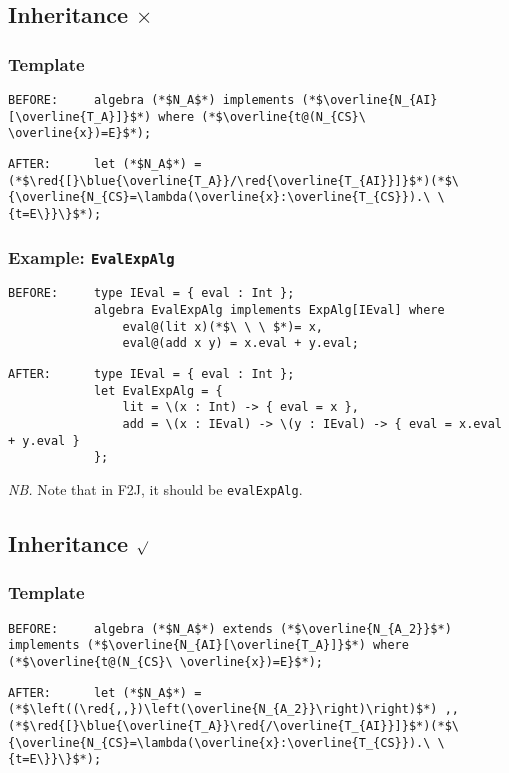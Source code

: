 \documentclass{article}
\newcommand{\red}[1]{\textcolor{red}{#1}}
\newcommand{\blue}[1]{\textcolor{blue}{#1}}
\newcommand{\nb}{\textit{NB. }}
\begin{document}
\begin{spacing}{1.1}
\subsection{Inheritance $\times$}

\subsubsection{Template}

\begin{lstlisting}[numbers=none]
BEFORE:     algebra (*$N_A$*) implements (*$\overline{N_{AI}[\overline{T_A}]}$*) where (*$\overline{t@(N_{CS}\ \overline{x})=E}$*);
\end{lstlisting}
\begin{lstlisting}[numbers=none]
AFTER:      let (*$N_A$*) = (*$\red{[}\blue{\overline{T_A}}/\red{\overline{T_{AI}}]}$*)(*$\{\overline{N_{CS}=\lambda(\overline{x}:\overline{T_{CS}}).\ \{t=E\}}\}$*);
\end{lstlisting}

\subsubsection{Example: \lstinline{EvalExpAlg}}

\begin{lstlisting}[numbers=none]
BEFORE:     type IEval = { eval : Int };
            algebra EvalExpAlg implements ExpAlg[IEval] where
                eval@(lit x)(*$\ \ \ $*)= x,
                eval@(add x y) = x.eval + y.eval;
\end{lstlisting}
\begin{lstlisting}[numbers=none]
AFTER:      type IEval = { eval : Int };
            let EvalExpAlg = {
                lit = \(x : Int) -> { eval = x },
                add = \(x : IEval) -> \(y : IEval) -> { eval = x.eval + y.eval }
            };
\end{lstlisting}

\nb Note that in F2J, it should be \lstinline{evalExpAlg}.

\subsection{Inheritance $\surd$}

\subsubsection{Template}

\begin{lstlisting}[numbers=none]
BEFORE:     algebra (*$N_A$*) extends (*$\overline{N_{A_2}}$*) implements (*$\overline{N_{AI}[\overline{T_A}]}$*) where (*$\overline{t@(N_{CS}\ \overline{x})=E}$*);
\end{lstlisting}
\begin{lstlisting}[numbers=none]
AFTER:      let (*$N_A$*) =  (*$\left((\red{,,})\left(\overline{N_{A_2}}\right)\right)$*) ,, (*$\red{[}\blue{\overline{T_A}}\red{/\overline{T_{AI}}]}$*)(*$\{\overline{N_{CS}=\lambda(\overline{x}:\overline{T_{CS}}).\ \{t=E\}}\}$*);
\end{lstlisting}


\end{spacing}
\end{document}

